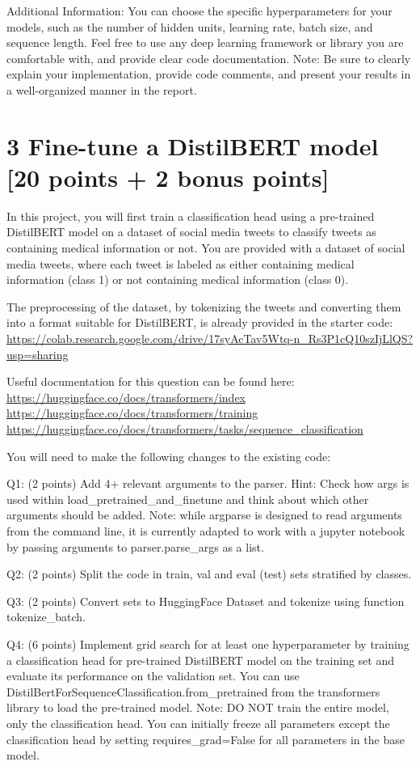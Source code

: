 \documentclass[
  letterpaper,
  DIV=11,
  numbers=noendperiod]{scrartcl}
\begin{document}
Additional Information: You can choose the specific hyperparameters for
your models, such as the number of hidden units, learning rate, batch
size, and sequence length. Feel free to use any deep learning framework
or library you are comfortable with, and provide clear code
documentation. Note: Be sure to clearly explain your implementation,
provide code comments, and present your results in a well-organized
manner in the report.

\section{3 Fine-tune a DistilBERT model {[}20 points + 2 bonus
points{]}}\label{fine-tune-a-distilbert-model-20-points-2-bonus-points}

In this project, you will first train a classification head using a
pre-trained DistilBERT model on a dataset of social media tweets to
classify tweets as containing medical information or not. You are
provided with a dataset of social media tweets, where each tweet is
labeled as either containing medical information (class 1) or not
containing medical information (class 0).

The preprocessing of the dataset, by tokenizing the tweets and
converting them into a format suitable for DistilBERT, is already
provided in the starter code:
\url{https://colab.research.google.com/drive/17syAcTav5Wtq-n_Rs3P1cQ10szIjLlQS?usp=sharing}

Useful documentation for this question can be found here:
\url{https://huggingface.co/docs/transformers/index}
\url{https://huggingface.co/docs/transformers/training}
\url{https://huggingface.co/docs/transformers/tasks/sequence_classification}

You will need to make the following changes to the existing code:

Q1: (2 points) Add 4+ relevant arguments to the parser. Hint: Check how
args is used within load\_pretrained\_and\_finetune and think about
which other arguments should be added. Note: while argparse is designed
to read arguments from the command line, it is currently adapted to work
with a jupyter notebook by passing arguments to parser.parse\_args as a
list.

Q2: (2 points) Split the code in train, val and eval (test) sets
stratified by classes.

Q3: (2 points) Convert sets to HuggingFace Dataset and tokenize using
function tokenize\_batch.

Q4: (6 points) Implement grid search for at least one hyperparameter by
training a classification head for pre-trained DistilBERT model on the
training set and evaluate its performance on the validation set. You can
use DistilBertForSequenceClassification.from\_pretrained from the
transformers library to load the pre-trained model. Note: DO NOT train
the entire model, only the classification head. You can initially freeze
all parameters except the classification head by setting
requires\_grad=False for all parameters in the base model.
\end{document}
